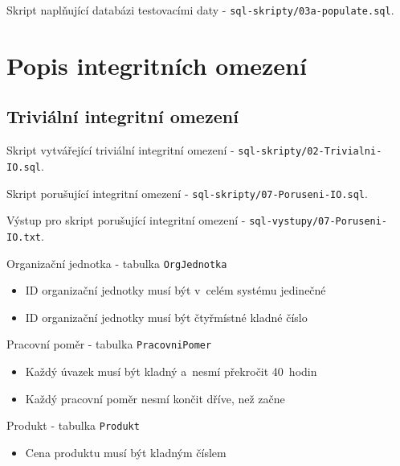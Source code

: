 \documentclass[a4paper,10pt]{article}
\begin{document}
\par Skript naplňující databázi testovacími daty - \texttt{sql-skripty/03a-populate.sql}.


\section{Popis integritních omezení}

\subsection*{Triviální integritní omezení}

\par Skript vytvářející triviální integritní
omezení - \texttt{sql-skripty/02-Trivialni-IO.sql}.

\par Skript porušující integritní omezení - \texttt{sql-skripty/07-Poruseni-IO.sql}.
\par Výstup pro skript porušující integritní
omezení - \texttt{sql-vystupy/07-Poruseni-IO.txt}.

\bigskip

\par Organizační jednotka - tabulka \texttt{OrgJednotka}

\begin{itemize}
	\item{ID organizační jednotky musí být v~celém systému jedinečné}
	\item{ID organizační jednotky musí být čtyřmístné kladné číslo}
\end{itemize}

\par Pracovní poměr - tabulka \texttt{PracovniPomer} 

\begin{itemize}
	\item{Každý úvazek musí být kladný a~nesmí překročit 40~hodin}
	\item{Každý pracovní poměr nesmí končit dříve, než začne}
\end{itemize}

\par Produkt - tabulka \texttt{Produkt} 

\begin{itemize}
	\item{Cena produktu musí být kladným číslem}
\end{itemize}
\end{document}
